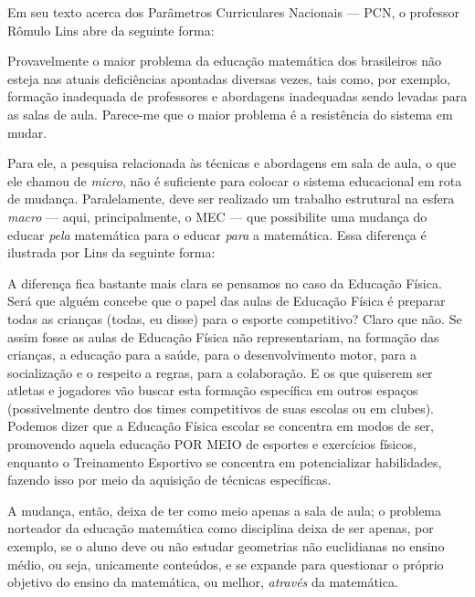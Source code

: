 \documentclass[
  12pt,
  letterpaper,
  DIV=11,
  numbers=noendperiod]{scrartcl}
\newenvironment{citacao}
    {\begin{quoting}[rightmargin=0cm,leftmargin=4cm]
    \begin{singlespace}
    \footnotesize
    }
    {\end{singlespace}
    \end{quoting}
}
\begin{document}
Em seu texto acerca dos Parâmetros Curriculares Nacionais --- PCN, o
professor Rômulo Lins abre da seguinte forma:

\begin{citacao}
Provavelmente o maior problema da educação matemática dos brasileiros não esteja nas atuais deficiências apontadas diversas vezes, tais como, por exemplo, formação inadequada de professores e abordagens inadequadas sendo levadas para as salas de aula. Parece-me que o maior
problema é a resistência do sistema em mudar. \citep{lins}
\end{citacao}

Para ele, a pesquisa relacionada às técnicas e abordagens em sala de
aula, o que ele chamou de \emph{micro}, não é suficiente para colocar o
sistema educacional em rota de mudança. Paralelamente, deve ser
realizado um trabalho estrutural na esfera \emph{macro} --- aqui,
principalmente, o MEC --- que possibilite uma mudança do educar
\emph{pela} matemática para o educar \emph{para} a matemática. Essa
diferença é ilustrada por Lins da seguinte forma:

\begin{citacao}
A diferença fica bastante mais clara se pensamos no caso da Educação Física. Será que alguém concebe que o papel das aulas de Educação Física é preparar todas as crianças (todas, eu disse) para o esporte competitivo? Claro que não. Se assim fosse as aulas de Educação Física não representariam, na formação das crianças, a educação para a saúde, para o desenvolvimento motor, para a socialização e o respeito a regras, para a colaboração. E os que quiserem ser atletas e jogadores vão buscar esta formação específica em outros espaços (possivelmente dentro dos times competitivos de suas escolas ou em clubes). Podemos dizer que a Educação Física escolar se concentra em modos de ser, promovendo aquela educação POR MEIO de esportes e exercícios físicos, enquanto o Treinamento Esportivo se concentra em potencializar habilidades, fazendo isso por meio da aquisição de técnicas específicas. \citep{lins}
\end{citacao}

A mudança, então, deixa de ter como meio apenas a sala de aula; o
problema norteador da educação matemática como disciplina deixa de ser
apenas, por exemplo, se o aluno deve ou não estudar geometrias não
euclidianas no ensino médio, ou seja, unicamente conteúdos, e se expande
para questionar o próprio objetivo do ensino da matemática, ou melhor,
\emph{através} da matemática.
\end{document}
